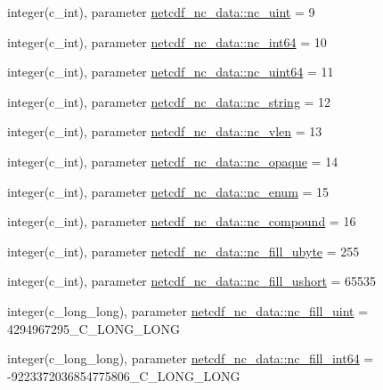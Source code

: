 \begin{DoxyCompactItemize}
\item 
integer(c\+\_\+int), parameter \hyperlink{namespacenetcdf__nc__data_a465430efec40241fb49becd7ac8b5822}{netcdf\+\_\+nc\+\_\+data\+::nc\+\_\+uint} = 9
\item 
integer(c\+\_\+int), parameter \hyperlink{namespacenetcdf__nc__data_adc6c029282e0811fc416812aa43411f6}{netcdf\+\_\+nc\+\_\+data\+::nc\+\_\+int64} = 10
\item 
integer(c\+\_\+int), parameter \hyperlink{namespacenetcdf__nc__data_a94f8f441963ecaa1fb1cecf853bcddd0}{netcdf\+\_\+nc\+\_\+data\+::nc\+\_\+uint64} = 11
\item 
integer(c\+\_\+int), parameter \hyperlink{namespacenetcdf__nc__data_a3d18f6f718959b79be4c3ccb6dbd9808}{netcdf\+\_\+nc\+\_\+data\+::nc\+\_\+string} = 12
\item 
integer(c\+\_\+int), parameter \hyperlink{namespacenetcdf__nc__data_a1a20bd329e3b1882d7d52cd5699b7dbd}{netcdf\+\_\+nc\+\_\+data\+::nc\+\_\+vlen} = 13
\item 
integer(c\+\_\+int), parameter \hyperlink{namespacenetcdf__nc__data_abce6e1a73832a59433f241cc7f21de62}{netcdf\+\_\+nc\+\_\+data\+::nc\+\_\+opaque} = 14
\item 
integer(c\+\_\+int), parameter \hyperlink{namespacenetcdf__nc__data_a9c53316bfb47f707160a68ad96edeb25}{netcdf\+\_\+nc\+\_\+data\+::nc\+\_\+enum} = 15
\item 
integer(c\+\_\+int), parameter \hyperlink{namespacenetcdf__nc__data_ae85ca0e45c6a67921086f2d06cb1137e}{netcdf\+\_\+nc\+\_\+data\+::nc\+\_\+compound} = 16
\item 
integer(c\+\_\+int), parameter \hyperlink{namespacenetcdf__nc__data_a444c1544828d5f1cf2142edd99b1199c}{netcdf\+\_\+nc\+\_\+data\+::nc\+\_\+fill\+\_\+ubyte} = 255
\item 
integer(c\+\_\+int), parameter \hyperlink{namespacenetcdf__nc__data_a263f4c0d24540e63c5d338f31269ce58}{netcdf\+\_\+nc\+\_\+data\+::nc\+\_\+fill\+\_\+ushort} = 65535
\item 
integer(c\+\_\+long\+\_\+long), parameter \hyperlink{namespacenetcdf__nc__data_a9a577b330e1ae120d78660244b6c2c46}{netcdf\+\_\+nc\+\_\+data\+::nc\+\_\+fill\+\_\+uint} = 4294967295\+\_\+\+C\+\_\+\+L\+O\+N\+G\+\_\+\+L\+O\+NG
\item 
integer(c\+\_\+long\+\_\+long), parameter \hyperlink{namespacenetcdf__nc__data_aa0b028ba0ee00c98200b755848afd9fe}{netcdf\+\_\+nc\+\_\+data\+::nc\+\_\+fill\+\_\+int64} = -\/9223372036854775806\+\_\+\+C\+\_\+\+L\+O\+N\+G\+\_\+\+L\+O\+NG
\item 

\end{DoxyCompactItemize}

